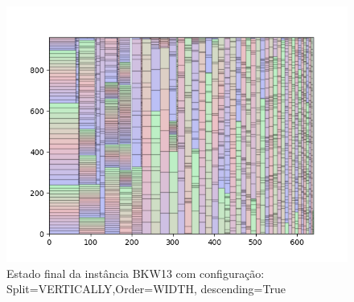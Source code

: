 \begin{figure}[H]
    \centering
    \caption[]{Estado final da instância BKW13 com configuração: Split=VERTICALLY,Order=WIDTH, descending=True}
    \label{fig:bkw13-vertically-width-true}
    \includegraphics[scale=0.5]{output/figures/bkw/bkw13/vertically/width/true/0000}
\end{figure}